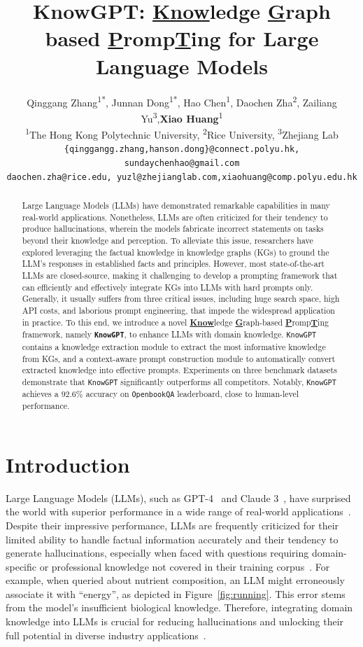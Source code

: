 \documentclass{article}
\title{KnowGPT: \underline{Know}ledge \underline{G}raph based \underline{P}romp\underline{T}ing for Large Language Models}
\author{%
  Qinggang Zhang\textsuperscript{1*}, Junnan Dong\textsuperscript{1*}, Hao Chen\textsuperscript{1}, Daochen Zha\textsuperscript{2}, Zailiang Yu\textsuperscript{3},\textbf{Xiao Huang}\textsuperscript{1}\\
  \textsuperscript{1}The Hong Kong Polytechnic University, \textsuperscript{2}Rice University, \textsuperscript{3}Zhejiang Lab\\
  \small{\texttt{\{qinggangg.zhang,hanson.dong\}@connect.polyu.hk, sundaychenhao@gmail.com}}\\ \small{\texttt{daochen.zha@rice.edu, yuzl@zhejianglab.com,xiaohuang@comp.polyu.edu.hk}} 
  }
\theoremstyle{boldremark}
\begin{document}
\maketitle


\begin{abstract}

Large Language Models (LLMs) have demonstrated remarkable capabilities in many real-world applications. Nonetheless, LLMs are often criticized for their tendency to produce hallucinations, wherein the models fabricate incorrect statements on tasks beyond their knowledge and perception. To alleviate this issue, researchers have explored leveraging the factual knowledge in knowledge graphs (KGs) to ground the LLM's responses in established facts and principles. However, most state-of-the-art LLMs are closed-source, making it challenging to develop a prompting framework that can efficiently and effectively integrate KGs into LLMs with hard prompts only. Generally, it usually suffers from three critical issues, including huge search space, high API costs, and laborious prompt engineering, that impede the widespread application in practice.
To this end, we introduce a novel \underline{\textbf{Know}}ledge \underline{\textbf{G}}raph-based \underline{\textbf{P}}romp\underline{\textbf{T}}ing framework, namely {\bf \texttt{KnowGPT}}, to enhance LLMs with domain knowledge. \texttt{KnowGPT} contains a knowledge extraction module to extract the most informative knowledge from KGs, and a context-aware prompt construction module to automatically convert extracted knowledge into effective prompts. Experiments on three benchmark datasets demonstrate that \texttt{KnowGPT} significantly outperforms all competitors. Notably, \texttt{KnowGPT} achieves a $92.6\%$ accuracy on \texttt{OpenbookQA} leaderboard, close to human-level performance.


\end{abstract}



\section{Introduction}



Large Language Models (LLMs), such as GPT-4~\cite{openai2023gpt4} and Claude 3~\cite{anthropic2024claude}, have surprised the world with superior performance in a wide range of real-world applications~\cite{kung2023performance,zha2023data}. Despite their impressive performance, LLMs are frequently criticized for their limited ability to handle factual information accurately and their tendency to generate hallucinations, especially when faced with questions requiring domain-specific or professional knowledge not covered in their training corpus~\cite{amaro2023ai,shen2023chatgpt}. For example, when queried about nutrient composition, an LLM might erroneously associate it with ``energy'', as depicted in Figure~\ref{fig:running}. 
This error stems from the model's insufficient biological knowledge. 
Therefore, integrating domain knowledge into LLMs is crucial for reducing hallucinations and unlocking their full potential in diverse industry applications~\cite{gravel2023fabricate}. 
\end{document}
